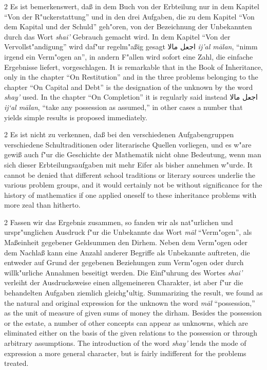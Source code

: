 \documentclass[10pt,a4paper]{article}
\renewcommand{\switchcolumn}{\syncronize\nointerlineskip\columnbreak}
\newcommand{\RL}[1]{\beginR#1\endR}
\newcommand{\ar}[1]{{\arabicfont\RL{#1}}}
\newcommand{\enquote}[1]{``#1''}
\begin{document}
\begin{paracol}{2}
Es ist bemerkenswert, da\ss{} in dem Buch von der Erbteilung nur in dem Kapitel \enquote{Von der R"uckerstattung} und in den drei Aufgaben, die zu dem Kapitel \enquote{Von dem Kapital und der Schuld} geh"oren, von der Bezeichnung der Unbekannten durch das Wort \textit{shai'} Gebrauch gemacht wird. In dem Kapitel \enquote{Von der Vervollst"andigung} wird daf"ur regelm"a\ss{}ig gesagt \ar{اجعل مالا} \textit{ij'al m\=alan}, \enquote{nimm irgend ein Verm"ogen an}, in andern F"allen wird sofort eine Zahl, die einfache Ergebnisse liefert, vorgeschlagen.
\switchcolumn
It is remarkable that in the Book of Inheritance, only in the chapter ``On Restitution'' and in the three problems belonging to the chapter ``On Capital and Debt'' is the designation of the unknown by the word \textit{shay'} used. In the chapter ``On Completion'' it is regularly said instead \ar{اجعل مالا} \textit{ij`al m\=alan}, ``take any possession as assumed,'' in other cases a number that yields simple results is proposed immediately.
\end{paracol}

\begin{paracol}{2}
Es ist nicht zu verkennen, da\ss{} bei den verschiedenen Aufgabengruppen verschiedene Schultraditionen oder literarische Quellen vorliegen, und es w"are gewi\ss{} auch f"ur die Geschichte der Mathematik nicht ohne Bedeutung, wenn man sich dieser Erbteilungsaufgaben mit mehr Eifer als bisher annehmen w"urde.
\switchcolumn
It cannot be denied that different school traditions or literary sources underlie the various problem groups, and it would certainly not be without significance for the history of mathematics if one applied oneself to these inheritance problems with more zeal than hitherto.
\end{paracol}

\begin{paracol}{2}
Fassen wir das Ergebnis zusammen, so fanden wir als nat"urlichen und urspr"unglichen Ausdruck f"ur die Unbekannte das Wort \textit{m\=al} \enquote{Verm"ogen}, als Ma\ss{}einheit gegebener Geldsummen den Dirhem. Neben dem Verm"ogen oder dem Nachla\ss{} kann eine Anzahl anderer Begriffe als Unbekannte auftreten, die entweder auf Grund der gegebenen Beziehungen zum Verm"ogen oder durch willk"urliche Annahmen beseitigt werden. Die Einf"uhrung des Wortes \textit{shai'} verleiht der Ausdrucksweise einen allgemeineren Charakter, ist aber f"ur die behandelten Aufgaben ziemlich gleichg"ultig.
\switchcolumn
Summarizing the result, we found as the natural and original expression for the unknown the word \textit{m\=al} ``possession,'' as the unit of measure of given sums of money the dirham. Besides the possession or the estate, a number of other concepts can appear as unknowns, which are eliminated either on the basis of the given relations to the possession or through arbitrary assumptions. The introduction of the word \textit{shay'} lends the mode of expression a more general character, but is fairly indifferent for the problems treated.
\end{paracol}
\clearpage
\end{document}
